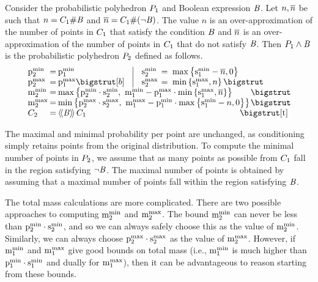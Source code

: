 \begin{definition}
  Consider the probabilistic polyhedron $\ppa$ and Boolean expression
  $\bexp$.  Let $n,\nn$ be such that $n = \absecount{\bexp}{\getpoly{1}}$ and
  $\nn = \absecount{(\neg\bexp)}{\getpoly{1}}$.  
The value $n$ is an over-approximation of the number of points in
$\getpoly{1}$ that satisfy the condition $\bexp$ and $\nn$ is an
over-approximation of the number of points in $\getpoly{1}$ that do
not satisfy $\bexp$.
Then $\absdcond{\ppa}{\bexp}$ is the probabilistic polyhedron $\ppb$
  defined as follows.
\[
\setlength{\arraycolsep}{1pt}
\begin{array}{lcl@{\hspace{0.35cm}}|@{\hspace{0.35cm}}lcl}
\pmin{2} &=& \pmin{1} &
\smin{2}\ &=&\ \maxparen{\smin{1} - \nn, 0}\\
\pmax{2} &=& \pmax{1} \bigstrut[b] &
\smax{2} &=&\ \minparen{\smax{1}, n} \bigstrut \\
\mmin{2} &=& \multicolumn{4}{l}{\maxparen{\pmin{2} \cdot
    \smin{2},\ \mmin{1} - \pmax{1} \cdot \minparen{\smax{1}, \nn}}} \bigstrut\\
\mmax{2} &=& \multicolumn{4}{l}{\minparen{\pmax{2} \cdot
    \smax{2},\ \mmax{1} - \pmin{1} \cdot \maxparen{\smin{1}-n, 0}}} \bigstrut\\
\getpoly{2} &=& \multicolumn{4}{l}{\abseeval{\bexp}{\pa}} \bigstrut[t] \\
\end{array}
\]
\end{definition}

The maximal and minimal probability per point
are unchanged, as conditioning simply retains points from
the original distribution.  To compute the minimal number of points in
$\pp{2}$, we assume that
as many points as possible from $\getpoly{1}$ fall in the region
satisfying $\neg\bexp$.  The maximal number of points is obtained by
assuming that a maximal number of points fall within the region
satisfying $\bexp$.

The total mass calculations are more complicated.  There are two
possible approaches to computing $\mmin{2}$ and $\mmax{2}$.  The bound
$\mmin{2}$ can never be less than $\pmin{2} \cdot \smin{2}$, and so we
can always safely choose this as the value of $\mmin{2}$.  Similarly,
we can always choose $\pmax{2} \cdot \smax{2}$ as the value of
$\mmax{2}$.  However, if $\mmin{1}$ and $\mmax{1}$ give good bounds on
total mass (i.e., $\mmin{1}$ is much higher than $\pmin{1} \cdot
\smin{1}$ and dually for $\mmax{1}$), then it can be advantageous to
reason starting from these bounds.

